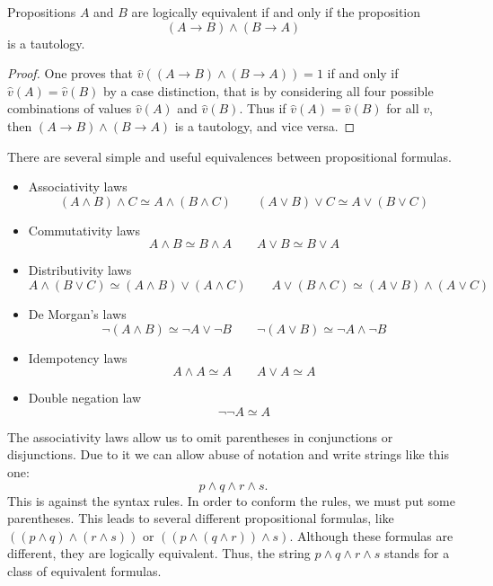 \begin{page}
\setcounter{section}{1}
\setcounter{subsection}{3}
\setcounter{dfn}{10}
\label{portion:437}

\begin{thm}
Propositions $A$ and $B$ are logically equivalent if and only if the proposition
\[
(A \to B) \wedge (B \to A)
\]
is a tautology.
\end{thm}

\end{page}

\begin{page}
\setcounter{section}{1}
\setcounter{subsection}{4}
\setcounter{dfn}{10}
\label{portion:438}

\begin{proof}
One proves that $\hat{v}((A \to B) \wedge (B \to A)) = 1$ if and only if $\hat{v}(A) = \hat{v}(B)$ by a case distinction,
that is by considering all four possible combinations of values $\hat{v}(A)$ and $\hat{v}(B)$.
Thus if $\hat{v}(A) = \hat{v}(B)$ for all $v$, then $(A \to B) \wedge (B \to A)$ is a tautology, and vice versa.
\end{proof}


There are several simple and useful equivalences between propositional formulas.
\begin{itemize}
\item
Associativity laws
\[
(A \wedge B) \wedge C \simeq A \wedge (B \wedge C) \qquad (A \vee B) \vee C \simeq A \vee (B \vee C)
\]
\item
Commutativity laws
\[
A \wedge B \simeq B \wedge A \qquad A \vee B \simeq B \vee A
\]
\item
Distributivity laws
\[
A \wedge (B \vee C) \simeq (A \wedge B) \vee (A \wedge C) \qquad A \vee (B \wedge C) \simeq (A \vee B) \wedge (A \vee C)
\]
\item
De Morgan's laws
\[
\neg(A \wedge B) \simeq \neg A \vee \neg B \qquad \neg(A \vee B) \simeq \neg A \wedge \neg B
\]
\item
Idempotency laws
\[
A \wedge A \simeq A \qquad A \vee A \simeq A
\]
\item
Double negation law
\[
\neg\neg A \simeq A
\]
\end{itemize}

The associativity laws allow us to omit parentheses in conjunctions or disjunctions.
Due to it we can allow abuse of notation and write strings like this one:
\[
p \wedge q \wedge r \wedge s.
\]
This is against the syntax rules.
In order to conform the rules, we must put some parentheses.
This leads to several different propositional formulas, like $((p \wedge q) \wedge (r \wedge s))$ or $((p \wedge (q \wedge r)) \wedge s)$.
Although these formulas are different, they are logically equivalent.
Thus, the string $p \wedge q \wedge r \wedge s$ stands for a class of equivalent formulas.


\end{page}
